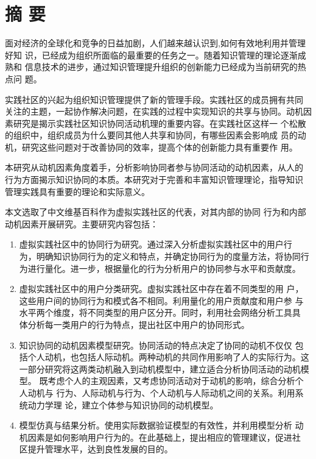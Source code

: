 \documentclass[adobefonts,cs4size,a4paper,openany]{ctexbook}
\begin{document}
\chapter*{摘 \quad 要}

面对经济的全球化和竞争的日益加剧，人们越来越认识到,如何有效地利用并管理好知
识，已经成为组织所面临的最重要的任务之一。随着知识管理的理论逐渐成熟和
信息技术的进步，通过知识管理提升组织的创新能力已经成为当前研究的热点问
题。

实践社区的兴起为组织知识管理提供了新的管理手段。实践社区的成员拥有共同
关注的主题，一起协作解决问题，在实践的过程中实现知识的共享与协同。动机因素研究是揭示实践社区知识协同活动机理的重要内容。在实践社区这样一
个松散的组织中，组织成员为什么要同其他人共享和协同，有哪些因素会影响成
员的动机，研究这些问题对于改善协同的效率，提高个体的创新能力具有重要作
用。

本研究从动机因素角度着手，分析影响协同者参与协同活动的动机因素，从人的
行为方面揭示知识协同的本质。本研究对于完善和丰富知识管理理论，指导知识
管理实践具有重要的理论和实际意义。

本文选取了中文维基百科作为虚拟实践社区的代表，对其内部的协同
行为和内部动机因素开展研究。主要研究内容包括：

\begin{enumerate}
\item 虚拟实践社区中的协同行为研究。通过深入分析虚拟实践社区中的用户行
  为，明确知识协同行为的定义和特点，并确定协同行为的度量方法，将协同行
  为进行量化。进一步，根据量化的行为分析用户的协同参与水平和贡献度。
\item 虚拟实践社区中的用户分类研究。虚拟实践社区中存在着不同类型的用
  户，这些用户间的协同行为和模式各不相同。利用量化的用户贡献度和用户参
  与水平两个维度，将不同类型的用户区分开。同时，利用社会网络分析工具具
  体分析每一类用户的行为特点，提出社区中用户的协同形式。
\item 知识协同的动机因素模型研究。协同活动的特点决定了协同的动机不仅仅
包括个人动机，也包括人际动机。两种动机的共同作用影响了人的实际行为。这
一部分研究将这两类动机融入到动机模型中，建立适合分析协同活动的动机模型。
既考虑个人的主观因素，又考虑协同活动对于动机的影响，综合分析个人动机与
行为、人际动机与行为、个人动机与人际动机之间的关系。利用系统动力学理
论，建立个体参与知识协同的动机模型。
\item 模型仿真与结果分析。使用实际数据验证模型的有效性，并利用模型分析
  动机因素是如何影响用户行为的。在此基础上，提出相应的管理建议，促进社
  区提升管理水平，达到良性发展的目的。

\end{enumerate}
\end{document}
